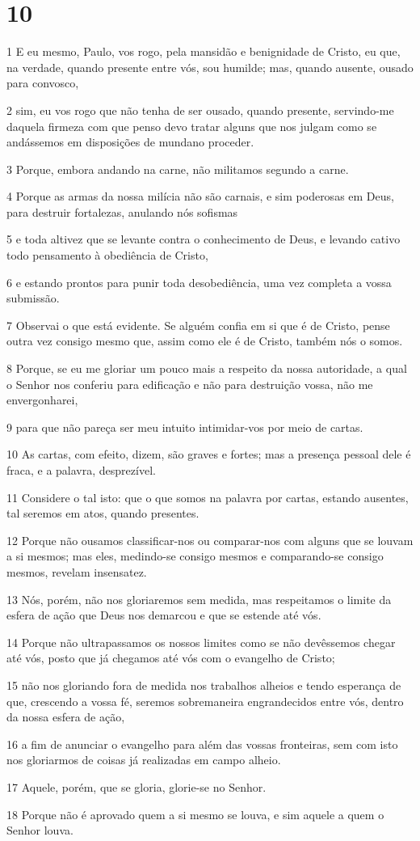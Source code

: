 \chapter{10}

\par 1 E eu mesmo, Paulo, vos rogo, pela mansidão e benignidade de Cristo, eu que, na verdade, quando presente entre vós, sou humilde; mas, quando ausente, ousado para convosco,
\par 2 sim, eu vos rogo que não tenha de ser ousado, quando presente, servindo-me daquela firmeza com que penso devo tratar alguns que nos julgam como se andássemos em disposições de mundano proceder.
\par 3 Porque, embora andando na carne, não militamos segundo a carne.
\par 4 Porque as armas da nossa milícia não são carnais, e sim poderosas em Deus, para destruir fortalezas, anulando nós sofismas
\par 5 e toda altivez que se levante contra o conhecimento de Deus, e levando cativo todo pensamento à obediência de Cristo,
\par 6 e estando prontos para punir toda desobediência, uma vez completa a vossa submissão.
\par 7 Observai o que está evidente. Se alguém confia em si que é de Cristo, pense outra vez consigo mesmo que, assim como ele é de Cristo, também nós o somos.
\par 8 Porque, se eu me gloriar um pouco mais a respeito da nossa autoridade, a qual o Senhor nos conferiu para edificação e não para destruição vossa, não me envergonharei,
\par 9 para que não pareça ser meu intuito intimidar-vos por meio de cartas.
\par 10 As cartas, com efeito, dizem, são graves e fortes; mas a presença pessoal dele é fraca, e a palavra, desprezível.
\par 11 Considere o tal isto: que o que somos na palavra por cartas, estando ausentes, tal seremos em atos, quando presentes.
\par 12 Porque não ousamos classificar-nos ou comparar-nos com alguns que se louvam a si mesmos; mas eles, medindo-se consigo mesmos e comparando-se consigo mesmos, revelam insensatez.
\par 13 Nós, porém, não nos gloriaremos sem medida, mas respeitamos o limite da esfera de ação que Deus nos demarcou e que se estende até vós.
\par 14 Porque não ultrapassamos os nossos limites como se não devêssemos chegar até vós, posto que já chegamos até vós com o evangelho de Cristo;
\par 15 não nos gloriando fora de medida nos trabalhos alheios e tendo esperança de que, crescendo a vossa fé, seremos sobremaneira engrandecidos entre vós, dentro da nossa esfera de ação,
\par 16 a fim de anunciar o evangelho para além das vossas fronteiras, sem com isto nos gloriarmos de coisas já realizadas em campo alheio.
\par 17 Aquele, porém, que se gloria, glorie-se no Senhor.
\par 18 Porque não é aprovado quem a si mesmo se louva, e sim aquele a quem o Senhor louva.


